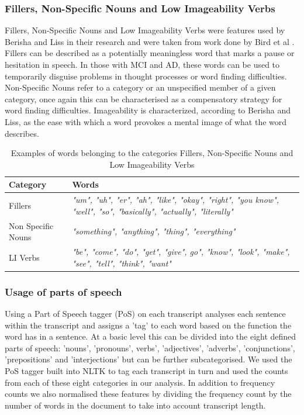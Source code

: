 \documentclass[12pt]{article}
\begin{document}
\subsubsection{Fillers, Non-Specific Nouns and Low Imageability Verbs}
Fillers, Non-Specific Nouns and Low Imageability Verbs were features used by Berisha and Liss in their research \cite{Berisha2015} and were taken from work done by Bird et al \cite{Bird2000}. Fillers can be described as a potentially meaningless word that marks a pause or hesitation in speech. In those with MCI and AD, these words can be used to temporarily disguise problems in thought processes or word finding difficulties. Non-Specific Nouns refer to a category or an unspecified member of a given category, once again this can be characterised as a compensatory strategy for word finding difficulties. Imageability is characterized, according to Berisha and Liss\cite{Berisha2015}, as the ease with which a word provokes a mental image of what the word describes. 

\begin{table}[H]
	\begin{center}
	\begin{tabular}{ | p{3cm} | p{10cm} |}
		\hline
		Category & Words \\ \hline
		Fillers & \textit{"um", "uh", "er", "ah", "like", "okay", "right",  "you know", "well", "so", "basically", "actually", "literally"} \\ \hline
		Non Specific Nouns & \textit{"something", "anything", "thing", "everything"} \\ \hline
		LI Verbs & \textit{"be", "come", "do", "get", "give", go", "know", "look", "make", "see", "tell", "think", "want"} \\ \hline
	\end{tabular}
	\caption{\label{tab:table-name}Examples of words belonging to the categories Fillers, Non-Specific Nouns and Low Imageability Verbs}
	\end{center} 
\end{table}

\subsubsection{Usage of parts of speech}
Using a Part of Speech tagger (PoS) on each transcript analyses each sentence within the transcript and assigns a 'tag' to each word based on the function the word has in a sentence. At a basic level this can be divided into the eight defined parts of speech: 'nouns', 'pronouns', verbs', 'adjectives', 'adverbs', 'conjunctions', 'prepositions' and 'interjections' but can be further subcategorised. We used the PoS tagger built into NLTK to tag each transcript in turn and used the counts from each of these eight categories in our analysis. In addition to frequency counts we also normalised these features by dividing the frequency count by the number of words in the document to take into account transcript length.
\end{document}
